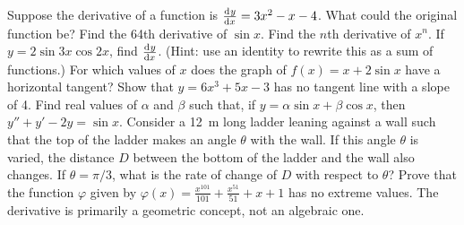 \begin{questions}
  \questioA Suppose the derivative of a function is $ \od{y}{x} = 3x^2 - x - 4 $. What could the original function be?
  \questioM Find the 64th derivative of $ \sin x $.
  \questioM Find the $ n$th derivative of $ x^n $.
  \questioM If $ y = 2\sin 3x \cos 2x $, find $ \od{y}{x} $. (Hint: use an identity to rewrite this as a sum of functions.)
  \questioM For which values of $ x $ does the graph of $ f(x) = x + 2\sin x $ have a horizontal tangent?
  \questioE Show that $ y = 6x^3 + 5x - 3 $ has no tangent line with a slope of 4.
  \questioE Find real values of $ \alpha $ and $ \beta $ such that, if $ y = \alpha \sin x + \beta \cos x $,
            then $ y'' + y' -2y = \sin x $.
  \questioE Consider a \SI{12}{\metre} long ladder leaning against a wall such that the top of the ladder makes an
            angle $ \theta $ with the wall. If this angle $ \theta $ is varied, the distance $ D $ between the bottom
            of the ladder and the wall also changes. If $ \theta = \pi/3 $, what is the rate of change of $ D $ with
            respect to $ \theta $?
  \questioE Prove that the function $ \varphi $ given by $ \varphi(x) = \frac{x^{101}}{101} + \frac{x^{51}}{51} + x + 1 $
            has no extreme values.
  \questioM The derivative is primarily a geometric concept, not an algebraic one.
\end{questions}
